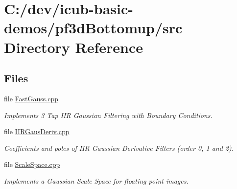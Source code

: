 \section{C\+:/dev/icub-\/basic-\/demos/pf3d\+Bottomup/src Directory Reference}
\label{dir_11110cf4ec97ab9f4ccc991ff6fd73d9}
\subsection*{Files}
\begin{DoxyCompactItemize}
\item 
file \hyperlink{FastGauss_8cpp}{Fast\+Gauss.\+cpp}
\begin{DoxyCompactList}\small\item\em Implements 3 Tap I\+IR Gaussian Filtering with Boundary Conditions. \end{DoxyCompactList}\item 
file \hyperlink{IIRGausDeriv_8cpp}{I\+I\+R\+Gaus\+Deriv.\+cpp}
\begin{DoxyCompactList}\small\item\em Coefficients and poles of I\+IR Gaussian Derivative Filters (order 0, 1 and 2). \end{DoxyCompactList}\item 
file \hyperlink{ScaleSpace_8cpp}{Scale\+Space.\+cpp}
\begin{DoxyCompactList}\small\item\em Implements a Gaussian Scale Space for floating point images. \end{DoxyCompactList}\end{DoxyCompactItemize}
